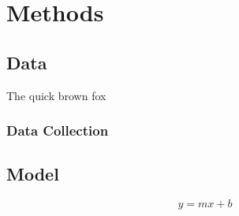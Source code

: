 \chapter{Methods}
\lipsum[6-9]
\section{Data}
\lipsum[12]
\begin{table}
  \centering
  \caption{The quick brown fox}
  
\end{table}
\lipsum[13]
\subsection{Data Collection}
\lipsum[16]
\section{Model}
\lipsum[20]
\begin{equation}
  y = mx + b
\end{equation}
\lipsum[22-25]